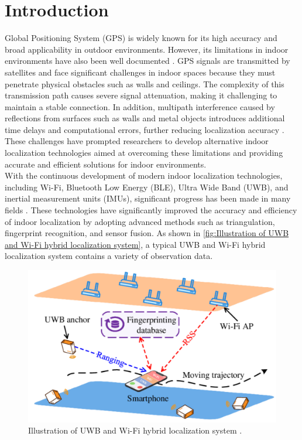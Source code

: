 \documentclass[12pt,a4paper]{article}
\numberwithin{equation}{section}
\begin{document}
\listoffigures
\newpage



\printnomenclature 




\newpage

\section{Introduction}
Global Positioning System (GPS)  is widely known for its high accuracy and broad applicability in outdoor environments. However, its limitations in indoor environments have also been well documented \cite{wahab2022indoor}. GPS signals are transmitted by satellites and face significant challenges in indoor spaces because they must penetrate physical obstacles such as walls and ceilings. The complexity of this transmission path causes severe signal attenuation, making it challenging to maintain a stable connection. In addition, multipath interference caused by reflections from surfaces such as walls and metal objects introduces additional time delays and computational errors, further reducing localization accuracy \cite{wahab2022indoor}. These challenges have prompted researchers to develop alternative indoor localization technologies aimed at overcoming these limitations and providing accurate and efficient solutions for indoor environments.\\
With the continuous development of modern indoor localization technologies, including Wi-Fi, Bluetooth Low Energy (BLE), Ultra Wide Band (UWB), and inertial measurement units (IMUs), significant progress has been made in many fields \cite{guo2019survey}. These technologies have significantly improved the accuracy and efficiency of indoor localization by adopting advanced methods such as triangulation, fingerprint recognition, and sensor fusion. As shown in \autoref{fig:Illustration of UWB and Wi-Fi hybrid localization system}, a typical UWB and Wi-Fi hybrid localization system contains a variety of observation data.\\
\begin{figure}[H]
    \centering
    \includegraphics[width=0.8\linewidth]{images/intro.png}
    \caption{Illustration of UWB and Wi-Fi hybrid localization system \cite{article}.}
    \label{fig:Illustration of UWB and Wi-Fi hybrid localization system}
\end{figure}
\end{document}
